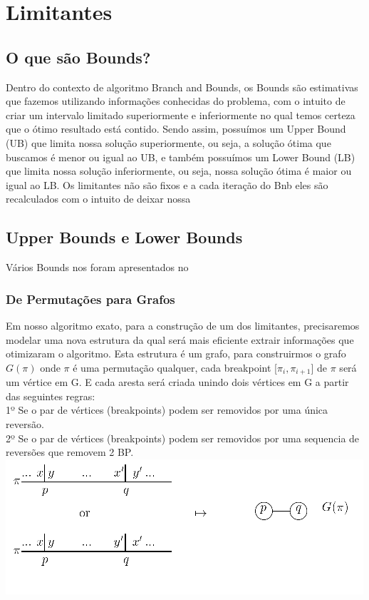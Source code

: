 \chapter{Limitantes}

\section{O que são Bounds?}
Dentro do contexto de algoritmo Branch and Bounds, os Bounds são estimativas que fazemos utilizando informações conhecidas do problema, com o intuito de criar um intervalo limitado superiormente e inferiormente no qual temos certeza que o ótimo resultado está contido. Sendo assim, possuímos um Upper Bound (UB) que limita nossa solução superiormente, ou seja, a solução ótima que buscamos é menor ou igual ao UB, e também possuímos um Lower Bound (LB) que limita nossa solução inferiormente, ou seja, nossa solução ótima é maior ou igual ao LB. Os limitantes não são fixos e a cada iteração do Bnb eles são recalculados com o intuito de deixar nossa 
\section{Upper Bounds e Lower Bounds}

Vários Bounds nos foram apresentados no 

\subsection{De Permutações para Grafos}

Em nosso algoritmo exato, para a construção de um dos limitantes, precisaremos modelar uma nova estrutura da qual será mais eficiente extrair informações que otimizaram o algoritmo. Esta estrutura é um grafo, para construirmos o grafo $G(\pi)$ onde $\pi$ é uma permutação qualquer, cada breakpoint [$\pi_i, \pi_{i+1}$] de $\pi$ será um vértice em G. E cada aresta será criada unindo dois vértices em G a partir das seguintes regras:\\

1º Se o par de vértices (breakpoints) podem ser removidos por uma única reversão. \\

2º Se o par de vértices (breakpoints) podem ser removidos por uma sequencia de reversões que removem 2 BP. \\


\includegraphics{Imagens/grafo exemplo.png}


